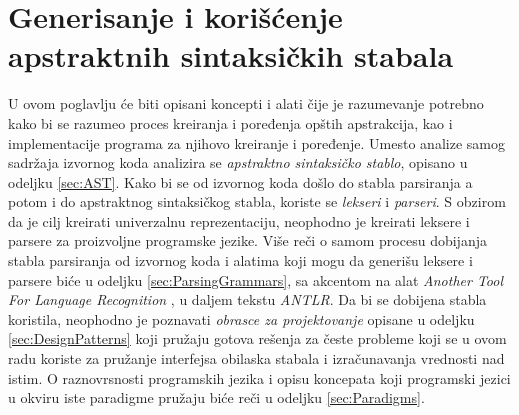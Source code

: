 \chapter{Generisanje i korišćenje apstraktnih sintaksičkih stabala}
\label{chp:RelevantTerms}

U ovom poglavlju će biti opisani koncepti i alati čije je razumevanje potrebno kako bi se razumeo proces kreiranja i poređenja opštih apstrakcija, kao i implementacije programa za njihovo kreiranje i poređenje. Umesto analize samog sadržaja izvornog koda analizira se \emph{apstraktno sintaksičko stablo}, opisano u odeljku \ref{sec:AST}. Kako bi se od izvornog koda došlo do stabla parsiranja a potom i do apstraktnog sintaksičkog stabla, koriste se \emph{lekseri} i \emph{parseri}. S obzirom da je cilj kreirati univerzalnu reprezentaciju, neophodno je kreirati leksere i parsere za proizvoljne programske jezike. Više reči o samom procesu dobijanja stabla parsiranja od izvornog koda i alatima koji mogu da generišu leksere i parsere biće u odeljku \ref{sec:ParsingGrammars}, sa akcentom na alat \emph{Another Tool For Language Recognition} \cite{ANTLR}, u daljem tekstu \emph{ANTLR}. Da bi se dobijena stabla koristila, neophodno je poznavati \emph{obrasce za projektovanje} opisane u odeljku \ref{sec:DesignPatterns} koji pružaju gotova rešenja za česte probleme koji se u ovom radu koriste za pružanje interfejsa obilaska stabala i izračunavanja vrednosti nad istim. O raznovrsnosti programskih jezika i opisu koncepata koji programski jezici u okviru iste paradigme pružaju biće reči u odeljku \ref{sec:Paradigms}.






